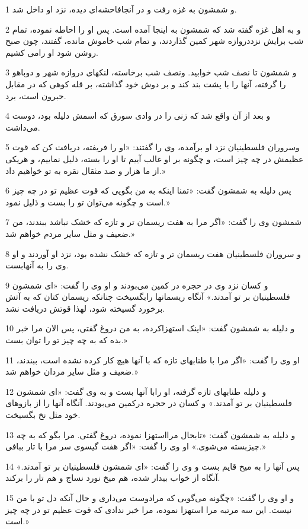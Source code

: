 \par 1 و شمشون به غزه رفت و در آنجافاحشه‌ای دیده، نزد او داخل شد.
\par 2 و به اهل غزه گفته شد که شمشون به اینجا آمده است. پس او را احاطه نموده، تمام شب برایش نزددروازه شهر کمین گذاردند، و تمام شب خاموش مانده، گفتند، چون صبح روشن شود او رامی کشیم.
\par 3 و شمشون تا نصف شب خوابید. ونصف شب برخاسته، لنکهای دروازه شهر و دوباهو را گرفته، آنها را با پشت بند کند و بر دوش خود گذاشته، بر قله کوهی که در مقابل حبرون است، برد.
\par 4 و بعد از آن واقع شد که زنی را در وادی سورق که اسمش دلیله بود، دوست می‌داشت.
\par 5 وسروران فلسطینیان نزد او برآمده، وی را گفتند: «او را فریفته، دریافت کن که قوت عظیمش در چه چیز است، و چگونه بر او غالب آییم تا او را بسته، ذلیل نماییم، و هریکی از ما هزار و صد مثقال نقره به تو خواهیم داد.»
\par 6 پس دلیله به شمشون گفت: «تمنا اینکه به من بگویی که قوت عظیم تو در چه چیز است و چگونه می‌توان تو را بست و ذلیل نمود.»
\par 7 شمشون وی را گفت: «اگر مرا به هفت ریسمان تر و تازه که خشک نباشد ببندند، من ضعیف و مثل سایر مردم خواهم شد.»
\par 8 و سروران فلسطینیان هفت ریسمان تر و تازه که خشک نشده بود، نزد او آوردند و او وی را به آنهابست.
\par 9 و کسان نزد وی در حجره در کمین می‌بودند و او وی را گفت: «ای شمشون فلسطینیان بر تو آمدند.» آنگاه ریسمانها رابگسیخت چنانکه ریسمان کتان که به آتش برخورد گسیخته شود، لهذا قوتش دریافت نشد.
\par 10 و دلیله به شمشون گفت: «اینک استهزاکرده، به من دروغ گفتی، پس الان مرا خبر بده که به چه چیز تو را توان بست.»
\par 11 او وی را گفت: «اگر مرا با طنابهای تازه که با آنها هیچ کار کرده نشده است، ببندند، ضعیف و مثل سایر مردان خواهم شد.»
\par 12 و دلیله طنابهای تازه گرفته، او رابا آنها بست و به وی گفت: «ای شمشون فلسطینیان بر تو آمدند.» و کسان در حجره درکمین می‌بودند. آنگاه آنها را از بازوهای خود مثل نخ بگسیخت.
\par 13 و دلیله به شمشون گفت: «تابحال مرااستهزا نموده، دروغ گفتی. مرا بگو که به چه چیزبسته می‌شوی.» او وی را گفت: «اگر هفت گیسوی سر مرا با تار ببافی.»
\par 14 پس آنها را به میخ قایم بست و وی را گفت: «ای شمشون فلسطینیان بر تو آمدند.» آنگاه از خواب بیدار شده، هم میخ نورد نساج و هم تار را برکند.
\par 15 و او وی را گفت: «چگونه می‌گویی که مرادوست می‌داری و حال آنکه دل تو با من نیست. این سه مرتبه مرا استهزا نموده، مرا خبر ندادی که قوت عظیم تو در چه چیز است.»
